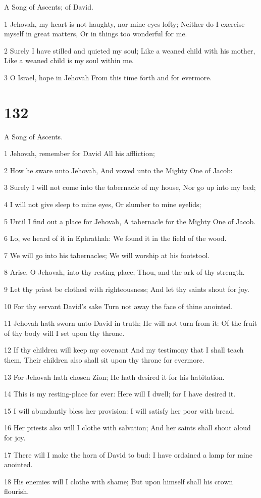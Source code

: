 \par A Song of Ascents; of David.

\par 1 Jehovah, my heart is not haughty, nor mine eyes lofty; Neither do I exercise myself in great matters, Or in things too wonderful for me.
\par 2 Surely I have stilled and quieted my soul; Like a weaned child with his mother, Like a weaned child is my soul within me.
\par 3 O Israel, hope in Jehovah From this time forth and for evermore.

\chapter{132}

\par A Song of Ascents.

\par 1 Jehovah, remember for David All his affliction;
\par 2 How he sware unto Jehovah, And vowed unto the Mighty One of Jacob:
\par 3 Surely I will not come into the tabernacle of my house, Nor go up into my bed;
\par 4 I will not give sleep to mine eyes, Or slumber to mine eyelids;
\par 5 Until I find out a place for Jehovah, A tabernacle for the Mighty One of Jacob.
\par 6 Lo, we heard of it in Ephrathah: We found it in the field of the wood.
\par 7 We will go into his tabernacles; We will worship at his footstool.
\par 8 Arise, O Jehovah, into thy resting-place; Thou, and the ark of thy strength.
\par 9 Let thy priest be clothed with righteousness; And let thy saints shout for joy.
\par 10 For thy servant David's sake Turn not away the face of thine anointed.
\par 11 Jehovah hath sworn unto David in truth; He will not turn from it: Of the fruit of thy body will I set upon thy throne.
\par 12 If thy children will keep my covenant And my testimony that I shall teach them, Their children also shall sit upon thy throne for evermore.
\par 13 For Jehovah hath chosen Zion; He hath desired it for his habitation.
\par 14 This is my resting-place for ever: Here will I dwell; for I have desired it.
\par 15 I will abundantly bless her provision: I will satisfy her poor with bread.
\par 16 Her priests also will I clothe with salvation; And her saints shall shout aloud for joy.
\par 17 There will I make the horn of David to bud: I have ordained a lamp for mine anointed.
\par 18 His enemies will I clothe with shame; But upon himself shall his crown flourish.

